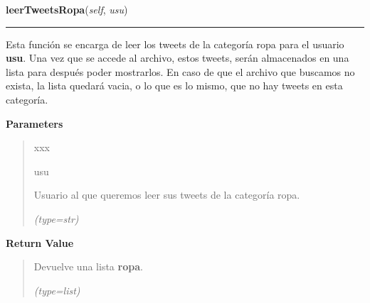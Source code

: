\hspace{.8\funcindent}\begin{boxedminipage}{\funcwidth}

    \raggedright \textbf{leerTweetsRopa}(\textit{self}, \textit{usu})

    \vspace{-1.5ex}

    \rule{\textwidth}{0.5\fboxrule}
\setlength{\parskip}{2ex}
    Esta función se encarga de leer los tweets de la categoría ropa para el
    usuario \textbf{usu}. Una vez que se accede al archivo, estos tweets, 
    serán almacenados en una lista para después poder mostrarlos. En caso 
    de que el archivo que buscamos no exista, la lista quedará vacia, o lo 
    que es lo mismo, que no hay tweets en esta categoría.

\setlength{\parskip}{1ex}
      \textbf{Parameters}
      \vspace{-1ex}

      \begin{quote}
        \begin{Ventry}{xxx}

          \item[usu]

          Usuario al que queremos leer sus tweets de la categoría ropa.

            {\it (type=str)}

        \end{Ventry}

      \end{quote}

      \textbf{Return Value}
    \vspace{-1ex}

      \begin{quote}
      Devuelve una lista \textbf{ropa}.

      {\it (type=list)}

      \end{quote}

    \end{boxedminipage}

    \label{funcionesTwitter:FuncionesTwitter:obtenerTweetsTerrorismo}

    \vspace{0.5ex}

